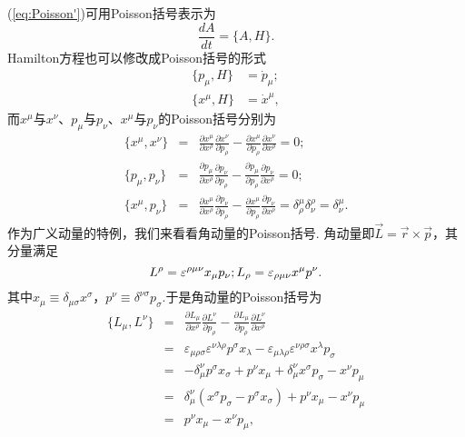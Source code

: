 		(\ref{eq:Poisson'})可用Poisson括号表示为
		\begin{equation}\label{eq:heq1}
		\frac{dA}{dt}=\{A,H\}.
		\end{equation}
		Hamilton方程也可以修改成Poisson括号的形式
		\begin{equation}
		\begin{split}
			\{p_\mu,H\}&={\dot{p}_\mu};\\
			\{x^\mu,H\}&={\dot{x}}^\mu,
		\end{split}
		\end{equation}
		而$x^\mu$与$x^\nu$、$p_\mu$与$p_\nu$、$x^\mu$与$p_\nu$的Poisson括号分别为
		\begin{eqnarray}\label{eq:xxppxp}
			\{x^\mu,x^\nu\}&=&\frac{\partial x^\mu}{\partial x^\rho}\frac{\partial x^\nu}{\partial p_\rho}-\frac{\partial x^\mu}{\partial p_\rho}\frac{\partial x^\nu}{\partial x^\rho}=0;\\
			\{p_\mu,p_\nu\}&=&\frac{\partial p_\mu}{\partial x^\rho}\frac{\partial p_\nu}{\partial p_\rho}-\frac{\partial p_\mu}{\partial p_\rho}\frac{\partial p_\nu}{\partial x^\rho}=0;\\
			\{x^\mu,p_\nu\}&=&\frac{\partial x^\mu}{\partial x^\rho}\frac{\partial p_\nu}{\partial p_\rho}-\frac{\partial x^\mu}{\partial p_\rho}\frac{\partial p_\nu}{\partial x^\rho}=\delta^\mu_\rho\delta^\rho_\nu=\delta^\mu_\nu.
		\end{eqnarray}
		作为广义动量的特例，我们来看看角动量的Poisson括号.
		角动量即$\overrightarrow{L}=\overrightarrow{r}\times\overrightarrow{p}$，其分量满足
		\begin{equation*}
			L^\rho=\varepsilon^{\rho\mu\nu}x_\mu p_\nu;\\
			L_\rho=\varepsilon_{\rho\mu\nu}x^\mu p^\nu.
		\end{equation*}
		其中$x_\mu\equiv\delta_{\mu\sigma}x^\sigma$，$p^\nu\equiv\delta^{\nu\sigma}p_\sigma$.于是角动量的Poisson括号为
		\begin{eqnarray*}
			\{L_\mu,L^\nu\}&=&\frac{\partial L_\mu}{\partial x^\rho}\frac{\partial L^\nu}{\partial p_\rho}-\frac{\partial L_\mu}{\partial p_\rho}\frac{\partial L^\nu}{\partial x^\rho}\\
			&=&\varepsilon_{\mu\rho\sigma}\varepsilon^{\nu\lambda\rho}p^\sigma x_\lambda-\varepsilon_{\mu\lambda\rho}\varepsilon^{\nu\rho\sigma}x^\lambda p_\sigma\\
			&=&-\delta^\nu_\mu p^\sigma x_\sigma+p^\nu x_\mu+\delta^\nu_\mu x^\sigma p_\sigma-x^\nu p_\mu\\
			&=&\delta^\nu_\mu\left(x^\sigma p_\sigma-p^\sigma x_\sigma\right)+p^\nu x_\mu-x^\nu p_\mu\\
			&=&p^\nu x_\mu-x^\nu p_\mu,
		\end{eqnarray*}
